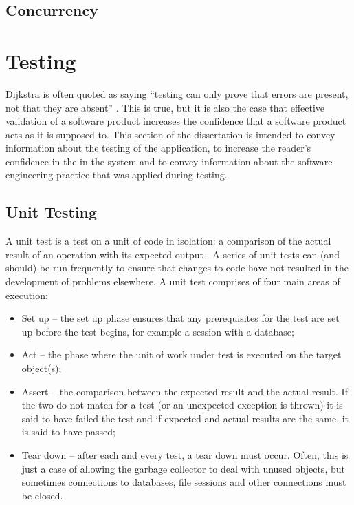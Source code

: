 \documentclass{l4proj}
\begin{document}
\section{Concurrency}


\chapter{Testing}
\label{testing}
Dijkstra is often quoted as saying ``testing can only prove that errors are present, not that they are absent'' \cite{dijkstra}. This is true, but it is also the case that effective validation of a software product increases the confidence that a software product acts as it is supposed to.  This section of the dissertation is intended to convey information about the testing of the application, to increase the reader's confidence in the in the system and to convey information about the software engineering practice that was applied during testing.

\section{Unit Testing}
A unit test is a test on a unit of code in isolation: a comparison of the actual result of an operation with its expected output \cite{unitTesting}.  A series of unit tests can (and should) be run frequently to ensure that changes to code have not resulted in the development of problems elsewhere.  A unit test comprises of four main areas of execution:
\begin{itemize}
	\item Set up -- the set up phase ensures that any prerequisites for the test are set up before the test begins, for example a session with a database;
	\item Act -- the phase where the unit of work under test is executed on the target object(s);
	\item Assert -- the comparison between the expected result and the actual result.  If the two do not match for a test (or an unexpected exception is thrown) it is said to have failed the test and if expected and actual results are the same, it is said to have passed;
	\item Tear down -- after each and every test, a tear down must occur.  Often, this is just a case of allowing the garbage collector to deal with unused objects, but sometimes connections to databases, file sessions and other connections must be closed.
\end{itemize}
\end{document}
